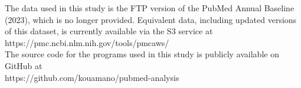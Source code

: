 The data used in this study is the FTP version of the PubMed Annual Baseline (2023), which is no longer provided.
Equivalent data, including updated versions of this dataset, is currently available via the S3 service at \\ https://pmc.ncbi.nlm.nih.gov/tools/pmcaws/ \\
The source code for the programs used in this study is publicly available on GitHub at \\ https://github.com/kouamano/pubmed-analysis \\

